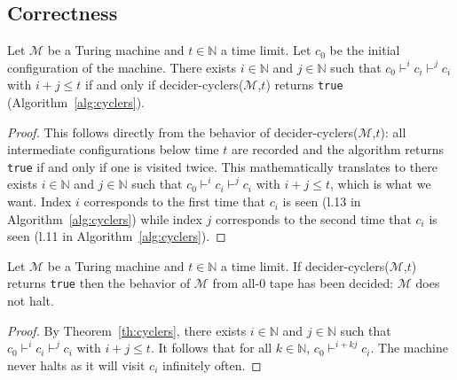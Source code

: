 \subsection{Correctness}



\begin{theorem}\label{th:cyclers}\normalfont Let $\mathcal{M}$ be a Turing machine and $t \in \mathbb{N}$ a time limit. Let $c_0$ be the initial configuration of the machine. There exists $i\in\mathbb{N}$ and $j\in\mathbb{N}$ such that $c_0 \vdash^i c_i \vdash^j c_i$ with $i+j \leq t$ if and only if {\sc decider-cyclers}($\mathcal{M}$,$t$) returns \texttt{true} (Algorithm~\ref{alg:cyclers}).
\end{theorem}
\begin{proof}
        This follows directly from the behavior of {\sc decider-cyclers}($\mathcal{M}$,$t$): all intermediate configurations below time $t$ are recorded and the algorithm returns \texttt{true} if and only if one is visited twice. This mathematically translates to
        there exists $i\in\mathbb{N}$ and $j\in\mathbb{N}$ such that $c_0 \vdash^i c_i \vdash^j c_i$ with $i+j \leq t$, which is what we want. Index $i$ corresponds to the first time that $c_i$ is seen (l.13 in Algorithm~\ref{alg:cyclers}) while index $j$ corresponds to the second time that $c_i$ is seen (l.11 in Algorithm~\ref{alg:cyclers}).
\end{proof}

\begin{corollary}\normalfont
        Let $\mathcal{M}$ be a Turing machine and $t \in \mathbb{N}$ a time limit. If {\sc decider-cyclers}($\mathcal{M}$,$t$) returns \texttt{true} then the behavior of $\mathcal{M}$ from all-0 tape has been decided: $\mathcal{M}$ does not halt.
\end{corollary}
\begin{proof}
        By Theorem~\ref{th:cyclers}, there exists $i\in\mathbb{N}$ and $j\in\mathbb{N}$ such that $c_0 \vdash^i c_i \vdash^j c_i$ with $i+j \leq t$. It follows that for all $k\in\mathbb{N}$, $c_0 \vdash^{i+kj} c_i$. The machine never halts as it will visit $c_i$ infinitely often.
\end{proof}

